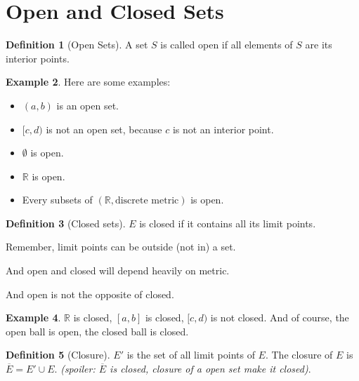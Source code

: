 \documentclass[12pt]{article}
\newcommand{\RR}{\mathbb{R}}   %
\theoremstyle{definition}
\newtheorem{definition}{Definition}[section]
\newtheorem{example}[definition]{Example}
\theoremstyle{plain}
\begin{document}
\section{Open and Closed Sets}

\begin{definition}[Open Sets]
A set $S$ is called open if all elements of $S$ are its interior points.
\end{definition}

\begin{example}
Here are some examples:
\begin{itemize}
    \item $(a,b)$ is an open set.
    \item $[c,d)$ is not an open set, because $c$ is not an interior point.
    \item $\emptyset$ is open.
    \item $\RR$ is open.
    \item Every subsets of $(\RR, \text{discrete metric})$ is open.
\end{itemize}
\end{example}

\begin{definition}[Closed sets]
$E$ is closed if it contains all its limit points.
\end{definition}

\begin{note}
Remember, limit points can be outside (not in) a set.

And open and closed will depend heavily on metric.

And open is not the opposite of closed.
\end{note}

\begin{example}
$\RR$ is closed, $[a,b]$ is closed, $[c,d)$ is not closed. And of course, the open ball is open, the closed ball is closed.
\end{example}

\begin{definition}[Closure]
$E'$ is the set of all limit points of $E$. The closure of $E$ is $\overline{E} = E' \cup E$. \textit{(spoiler: $\overline{E}$ is closed, closure of a open set make it closed)}.
\end{definition}
\end{document}
